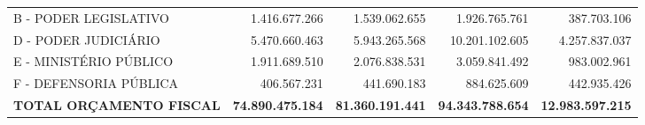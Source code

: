 \documentclass{article}
\begin{document}
\begin{longtable}[c]{m{5cm}|m{3cm}|m{3cm}|m{3cm}|m{3cm}}
\multicolumn{1}{L{5cm}|}{ B - PODER LEGISLATIVO } & \multicolumn{1}{r|}{ 1.416.677.266 } & \multicolumn{1}{r|}{ 1.539.062.655 } & \multicolumn{1}{r|}{ 1.926.765.761 } & \multicolumn{1}{r}{ 387.703.106 } \\
\multicolumn{1}{L{5cm}|}{ D - PODER JUDICIÁRIO } & \multicolumn{1}{r|}{ 5.470.660.463 } & \multicolumn{1}{r|}{ 5.943.265.568 } & \multicolumn{1}{r|}{ 10.201.102.605 } & \multicolumn{1}{r}{ 4.257.837.037 } \\
\multicolumn{1}{L{5cm}|}{ E - MINISTÉRIO PÚBLICO } & \multicolumn{1}{r|}{ 1.911.689.510 } & \multicolumn{1}{r|}{ 2.076.838.531 } & \multicolumn{1}{r|}{ 3.059.841.492 } & \multicolumn{1}{r}{ 983.002.961 } \\
\multicolumn{1}{L{5cm}|}{ F - DEFENSORIA PÚBLICA } & \multicolumn{1}{r|}{ 406.567.231 } & \multicolumn{1}{r|}{ 441.690.183 } & \multicolumn{1}{r|}{ 884.625.609 } & \multicolumn{1}{r}{ 442.935.426 } \\
\hline \hline 
\multicolumn{1}{L{5cm}|}{ \textbf{TOTAL ORÇAMENTO FISCAL }} & \multicolumn{1}{r|}{ \textbf{ 74.890.475.184 }} & \multicolumn{1}{r|}{ \textbf{ 81.360.191.441 }} & \multicolumn{1}{r|}{ \textbf{ 94.343.788.654 }} & \multicolumn{1}{r}{ \textbf{ 12.983.597.215 }} \\\end{longtable}\raggedright\fontsize{9pt}{10pt}\selectfont {FONTE: Armazém SIAFI.} \\\vskip 0.2cm\fontsize{9pt}{10pt}\selectfont {ELABORAÇÃO: DCAF/SCPPO/SEPLAG}\\\vskip 0.2cm\fontsize{9pt}{10pt}\selectfont {Nota: Na elaboração deste relatório foram consideradas as estimativas de inflação previstas no Boletim Focus de 21/09/18, com projeção de IPCA de 4,28\% para 2018 e 4,18\% para 2019.}\\
\end{document}
